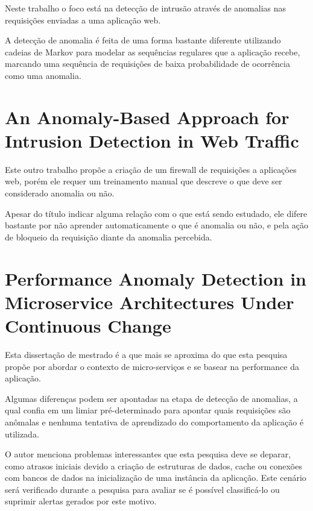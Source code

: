 Neste trabalho o foco está na detecção de intrusão através de anomalias nas
requisições enviadas a uma aplicação web.

A detecção de anomalia é feita de uma forma bastante diferente utilizando cadeias
de Markov para modelar as sequências regulares que a aplicação recebe, marcando
uma sequência de requisições de baixa probabilidade de ocorrência como uma anomalia.

\section{An Anomaly-Based Approach for Intrusion Detection in Web Traffic \citep{TorranoGimnez2010AnAA}}
\label{sec:an-anomaly-based-approach-for-intrusion-detection-in-web-traffic}

Este outro trabalho propõe a criação de um firewall de requisições a aplicações web,
porém ele requer um treinamento manual que descreve o que deve ser considerado
anomalia ou não.

Apesar do título indicar alguma relação com o que está sendo estudado, ele difere
bastante por não aprender automaticamente o que é anomalia ou não, e pela ação de
bloqueio da requisição diante da anomalia percebida.

\section{Performance Anomaly Detection in Microservice Architectures Under Continuous Change \citep{dullmann}}
\label{sec:performance-anomaly-detection-in-microservice-architectures-under-continuous-change}

Esta dissertação de mestrado é a que mais se aproxima do que esta pesquisa propõe
por abordar o contexto de micro-serviços e se basear na performance da aplicação.

Algumas diferenças podem ser apontadas na etapa de detecção de anomalias, a qual
confia em um limiar pré-determinado para apontar quais requisições são anômalas e
nenhuma tentativa de aprendizado do comportamento da aplicação é utilizada.

O autor menciona problemas interessantes que esta pesquisa deve se deparar, como
atrasos iniciais devido a criação de estruturas de dados, cache ou conexões com
bancos de dados na inicialização de uma instância da aplicação. Este cenário será
verificado durante a pesquisa para avaliar se é possível classificá-lo ou suprimir
alertas gerados por este motivo.


